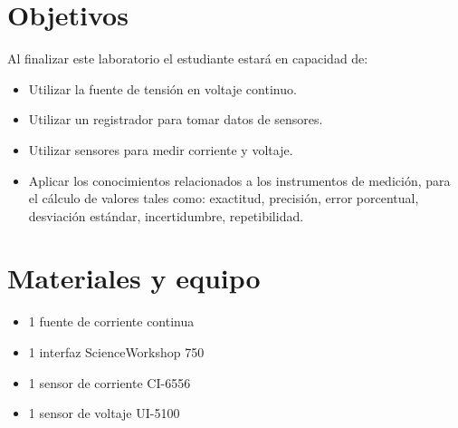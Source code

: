 \documentclass[12pt,letterpaper]{report}
\newcommand{\obj}{Objetivos}
\newcommand{\mat}{Materiales y equipo}
\newcommand{\capacidad}{Al finalizar este laboratorio el estudiante estará en capacidad de:}
\begin{document}
\section{\obj}
\capacidad
\begin{itemize}
\item Utilizar la fuente de tensión en voltaje continuo.
\item Utilizar un registrador para tomar datos de sensores.
\item Utilizar sensores para medir corriente y voltaje.
\item Aplicar los conocimientos relacionados a los instrumentos de medición, para el cálculo de valores tales como: exactitud, precisión, error porcentual, desviación estándar, incertidumbre, repetibilidad.
\end{itemize}

\section{\mat}
\begin{itemize}
\item 1 fuente de corriente continua
\item 1 interfaz ScienceWorkshop\,\textregistered\,750
\item 1 sensor de corriente CI-6556
\item 1 sensor de voltaje UI-5100
\end{itemize}
\end{document}
